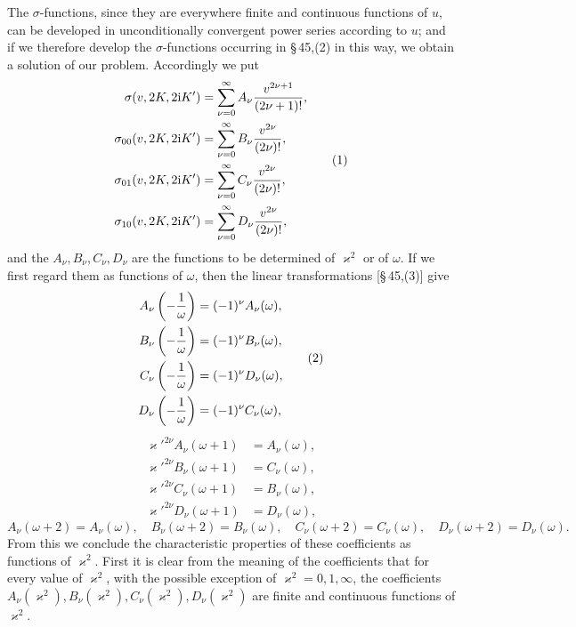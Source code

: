 \documentclass[11pt]{article}
\providecommand{\ii}{\mathrm{i}}
\begin{document}
The $\sigma$-functions, since they are everywhere finite and continuous functions of $u$, can be developed in unconditionally convergent power series according to $u$; and if we therefore develop the $\sigma$-functions occurring in \S\,45,(2) in this way, we obtain a solution of our problem. Accordingly we put
\begin{equation}
\begin{aligned}
\sigma(v,2K,2\ii K')&=\sum_{\nu=0}^{\infty}A_\nu{v^{2\nu+1}\over(2\nu+1)!},\\
\sigma_{00}(v,2K,2\ii K')&=\sum_{\nu=0}^{\infty}B_\nu{v^{2\nu}\over(2\nu)!},\\
\sigma_{01}(v,2K,2\ii K')&=\sum_{\nu=0}^{\infty}C_\nu{v^{2\nu}\over(2\nu)!},\\
\sigma_{10}(v,2K,2\ii K')&=\sum_{\nu=0}^{\infty}D_\nu{v^{2\nu}\over(2\nu)!},
\end{aligned}
\tag{1}
\end{equation}
and the $A_\nu,B_\nu,C_\nu,D_\nu$ are the functions to be determined of $\varkappa^2$ or of $\omega$. If we first regard them as functions of $\omega$, then the linear transformations [\S\,45,(3)] give
\begin{equation}
\begin{aligned}
A_\nu\left(-{1\over\omega}\right)&=(-1)^\nu A_\nu(\omega),\\
B_\nu\left(-{1\over\omega}\right)&=(-1)^\nu B_\nu(\omega),\\
C_\nu\left(-{1\over\omega}\right)&=(-1)^\nu D_\nu(\omega),\\
D_\nu\left(-{1\over\omega}\right)&=(-1)^\nu C_\nu(\omega),
\end{aligned}
\tag{2}
\end{equation}
\begin{equation}
\begin{aligned}
\varkappa'^{2\nu}A_\nu(\omega+1)&=A_\nu(\omega),\\
\varkappa'^{2\nu}B_\nu(\omega+1)&=C_\nu(\omega),\\
\varkappa'^{2\nu}C_\nu(\omega+1)&=B_\nu(\omega),\\
\varkappa'^{2\nu}D_\nu(\omega+1)&=D_\nu(\omega),
\end{aligned}
\tag{3}
\end{equation}
\begin{equation}
A_\nu(\omega+2)=A_\nu(\omega),
\quad
B_\nu(\omega+2)=B_\nu(\omega),
\quad
C_\nu(\omega+2)=C_\nu(\omega),
\quad
D_\nu(\omega+2)=D_\nu(\omega).
\tag{4}
\end{equation}
From this we conclude the characteristic properties of these coefficients as functions of $\varkappa^2$. First it is clear from the meaning of the coefficients that for every value of $\varkappa^2$, with the possible exception of $\varkappa^2=0,1,\infty$, the coefficients $A_\nu(\varkappa^2),B_\nu(\varkappa^2),C_\nu(\varkappa^2),D_\nu(\varkappa^2)$ are finite and continuous functions of $\varkappa^2$.
\end{document}
